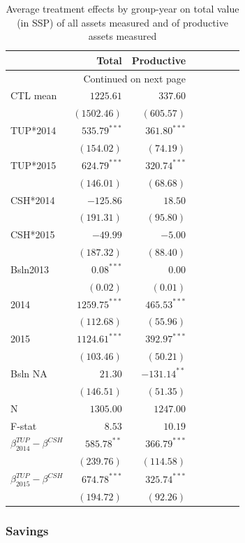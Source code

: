 \documentclass[12pt,article]{article}
\begin{document}
\begin{longtable}{lrrrrrrr}
\caption{\label{tab:assets}Average treatment effects by group-year on total value (in SSP) of all assets measured and of productive assets measured}
\\
\hline
 & Total & Productive\\
\hline
\endhead
\hline\multicolumn{3}{r}{Continued on next page} \\
\endfoot
\endlastfoot
CTL mean & $1225.61$ & $337.60$\\
 & $(1502.46)$ & $(605.57)$\\
\hline
TUP*2014 & $535.79^{***}$ & $361.80^{***}$\\
 & $(154.02)$ & $(74.19)$\\
TUP*2015 & $624.79^{***}$ & $320.74^{***}$\\
 & $(146.01)$ & $(68.68)$\\
CSH*2014 & $-125.86$ & $18.50$\\
 & $(191.31)$ & $(95.80)$\\
CSH*2015 & $-49.99$ & $-5.00$\\
 & $(187.32)$ & $(88.40)$\\
Bsln2013 & $0.08^{***}$ & $0.00$\\
 & $( 0.02)$ & $( 0.01)$\\
2014 & $1259.75^{***}$ & $465.53^{***}$\\
 & $(112.68)$ & $(55.96)$\\
2015 & $1124.61^{***}$ & $392.97^{***}$\\
 & $(103.46)$ & $(50.21)$\\
Bsln NA & $21.30$ & $-131.14^{**}$\\
 & $(146.51)$ & $(51.35)$\\
\hline
N & $1305.00$ & $1247.00$\\
F-stat & $8.53$ & $10.19$\\
\hline
$\beta^{TUP}_{2014}-\beta^{CSH}$ & $585.78^{**}$ & $366.79^{***}$\\
 & $(239.76)$ & $(114.58)$\\
$\beta^{TUP}_{2015}-\beta^{CSH}$ & $674.78^{***}$ & $325.74^{***}$\\
 & $(194.72)$ & $(92.26)$\\
\hline
\end{longtable}


\subsubsection*{Savings}
\label{sec-3-5-2}
\end{document}
